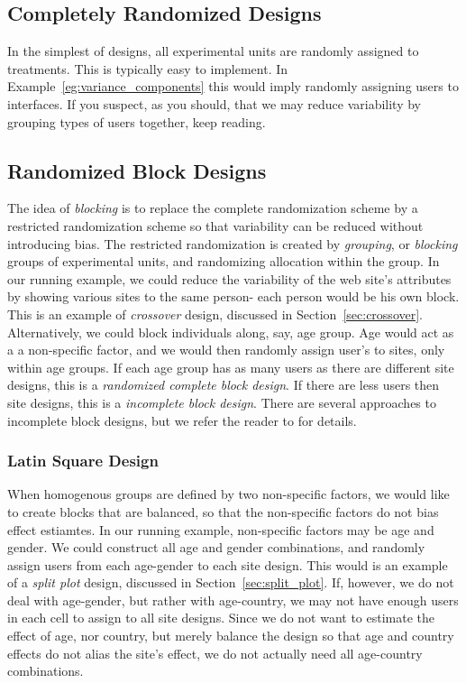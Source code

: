 \subsection{Completely Randomized Designs}
In the simplest of designs, all experimental units are randomly assigned to treatments. 
This is typically easy to implement.
In Example~\ref{eg:variance_components} this would imply randomly assigning users to interfaces.
If you suspect, as you should, that we may reduce variability by grouping types of users together, keep reading.



\subsection{Randomized Block Designs}
The idea of \emph{blocking} is to replace the complete randomization scheme by a restricted randomization scheme so that variability can be reduced without introducing bias. 
The restricted randomization is created by \emph{grouping}, or \emph{blocking} groups of experimental units, and randomizing allocation within the group. 
In our running example, we could reduce the variability of the web site's attributes by showing various sites to the same person- each person would be his own block. This is an example of \emph{crossover} design, discussed in Section~\ref{sec:crossover}.
Alternatively, we could block individuals along, say, age group. Age would act as a a non-specific factor, and we would then randomly assign user's to sites, only within age groups.
If each age group has as many users as there are different site designs, this is a \emph{randomized complete block design}.
If there are less users then site designs, this is a \emph{incomplete block design}.
There are several approaches to incomplete block designs, but we refer the reader to \cite[Sec.4.2]{cox_theory_2000} for details.




\subsubsection{Latin Square Design}
When homogenous groups are defined by two non-specific factors, we would like to create blocks that are balanced, so that the non-specific factors do not bias effect estiamtes.
In our running example, non-specific factors may be age and gender. 
We could construct all age and gender combinations, and randomly assign users from each age-gender to each site design.
This would is an example of a \emph{split plot} design, discussed in Section~\ref{sec:split_plot}.
If, however, we do not deal with age-gender, but rather with age-country, we may not have enough users in each cell to assign to all site designs. 
Since we do not want to estimate the effect of age, nor country, but merely balance the design so that age and country effects do not alias the site's effect, we do not actually need all age-country combinations. 



